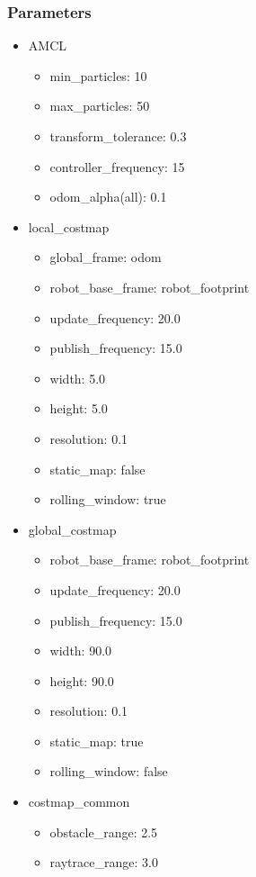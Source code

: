 \documentclass[10pt,journal,compsoc]{IEEEtran}
\begin{document}
\subsubsection{Parameters}
\begin{itemize}
\item AMCL \begin{itemize}
\item	min\_particles: 10
\item max\_particles: 50
\item transform\_tolerance: 0.3
\item controller\_frequency: 15
\item odom\_alpha(all): 0.1
\end{itemize}

\item local\_costmap
\begin{itemize}%
 \item  global\_frame: odom
 \item  robot\_base\_frame: robot\_footprint
 \item  update\_frequency: 20.0
  \item publish\_frequency: 15.0
 \item  width: 5.0
 \item  height: 5.0
 \item  resolution: 0.1
 \item  static\_map: false
  \item rolling\_window: true
\end{itemize}

\item global\_costmap
\begin{itemize}
  \item robot\_base\_frame: robot\_footprint
  \item update\_frequency: 20.0
  \item publish\_frequency: 15.0
  \item width: 90.0
  \item height: 90.0
  \item resolution: 0.1
  \item static\_map: true
  \item rolling\_window: false
\end{itemize}


\item costmap\_common
\begin{itemize}
\item obstacle\_range: 2.5
\item raytrace\_range: 3.0


\end{itemize}
\end{itemize}
\end{document}
